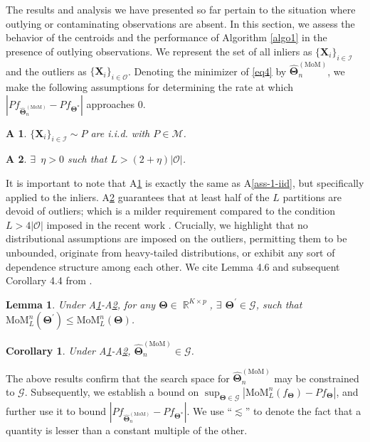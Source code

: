 \documentclass{article}
\def\Real{\mathop{\mathbb{R}}\nolimits}
\newcommand{\bX}{\boldsymbol{X}}
\newcommand{\bTheta}{\boldsymbol{\Theta}}
\newcommand{\I}{\mathcal{I}}
\newcommand{\cO}{\mathcal{O}}
\newcommand{\tm}{\widehat{\bTheta}_n^{(\text{MoM})}}
\newtheorem{lemma}{Lemma}[section]
\newtheorem{cor}{Corollary}[section]
\newtheorem{assumption}{A\hspace{-2pt}}
\begin{document}
The results and analysis we have presented so far pertain to the situation where outlying or contaminating observations are absent. In this section, we assess the behavior of the centroids and the performance of Algorithm \ref{algo1} in the presence of outlying observations. %
  We represent the set of all inliers as $\{\bX_i\}_{i \in \I}$ and the outliers as $\{\bX_i\}_{i \in \cO}$. Denoting the minimizer of \eqref{eq4} by $\tm$, we make the following assumptions for determining the rate at which $|Pf_{\tm} - Pf_{\bTheta^\ast}|$ approaches $0$. %

\begin{assumption}\label{ass-4-iid}
    $\{\bX_i\}_{i \in \I}\sim P$ are i.i.d. with $P \in \mathcal{M}$.
\end{assumption}

\begin{assumption}\label{ass-5-L}
    $\exists$ $\, \eta > 0$ such that $L>(2+\eta)|\cO|$.
\end{assumption}

It is important to note that A\ref{ass-4-iid} is exactly the same as A\ref{ass-1-iid}, but specifically applied to the inliers. A\ref{ass-5-L} guarantees that at least half of the $L$ partitions are devoid of outliers; which is a milder requirement compared to the condition $L > 4|\cO|$ imposed in the recent work \citep{lecue2020robust}. Crucially, we highlight that no distributional assumptions are imposed on the outliers, permitting them to be unbounded, originate from heavy-tailed distributions, or exhibit any sort of dependence structure among each other. We cite Lemma 4.6 and subsequent Corollary 4.4 from \citep{paul2021uniform}.

\begin{lemma}\label{lemma-6-spmom}
Under A\ref{ass-4-iid}-A\ref{ass-5-L}, for any $\bTheta \in \Real^{K\times p}$, $\exists$ $\bTheta^\prime \in \mathscr{G}$, such that $\text{MoM}_L^n(\bTheta^\prime) \le \text{MoM}_L^n(\bTheta)$.
\end{lemma}

\begin{cor}
Under A\ref{ass-4-iid}-A\ref{ass-5-L}, $\tm \in \mathscr{G}$.
\end{cor}

The above results confirm that the search space for $\tm$ may be constrained to $\mathscr{G}$. Subsequently, we establish a bound on $\sup_{\bTheta \in \mathscr{G}} |\text{MoM}^n_L (f_{\bTheta}) - Pf_{\bTheta} |$, and further use it to bound $|P f_{\tm} - P f_{\bTheta^\ast}|$. 
We %
use ``$\lesssim$'' to denote the fact that a quantity is lesser than a constant multiple of the other. %
\end{document}
